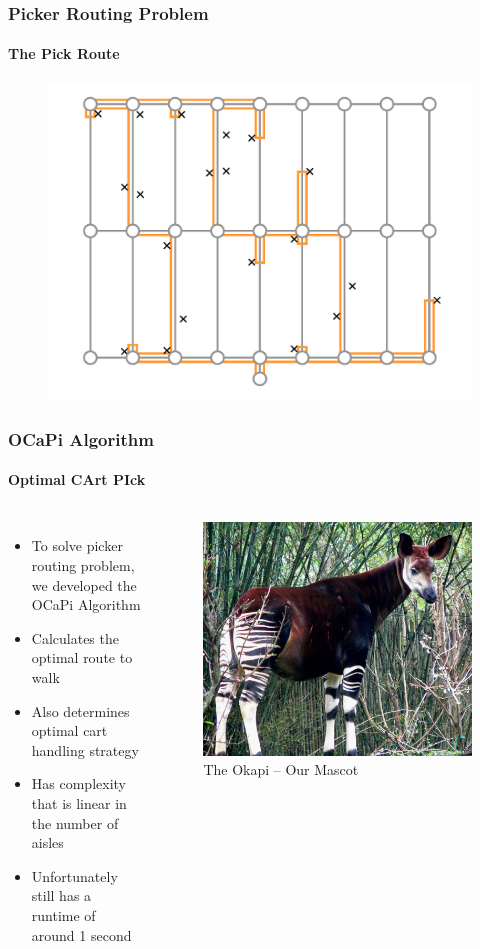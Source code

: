 \documentclass[english,a4,aspectratio=169]{beamer}
\begin{document}
\begin{frame}
\frametitle{Picker Routing Problem}
\framesubtitle{The Pick Route}
 \begin{figure}
  \centering
  \includegraphics[width=.6\textwidth]{../figures/route_optimal.pdf}
 \end{figure}
\end{frame}

\begin{frame}
\frametitle{OCaPi Algorithm}
\framesubtitle{Optimal CArt PIck}
\begin{columns}[c]
\begin{itemize}
 \item To solve picker routing problem, we developed the OCaPi Algorithm
 \item Calculates the optimal route to walk
 \item Also determines optimal cart handling strategy
 \item<2-> Has complexity that is linear in the number of aisles
 \item<3-> Unfortunately still has a runtime of around 1 second
\end{itemize}
 \begin{figure}
  \centering
  \includegraphics[width=.7\textwidth]{../figures/Okapi2.jpg}
  \caption{The Okapi -- Our Mascot}
 \end{figure}
 \end{columns}
\end{frame}
\end{document}
